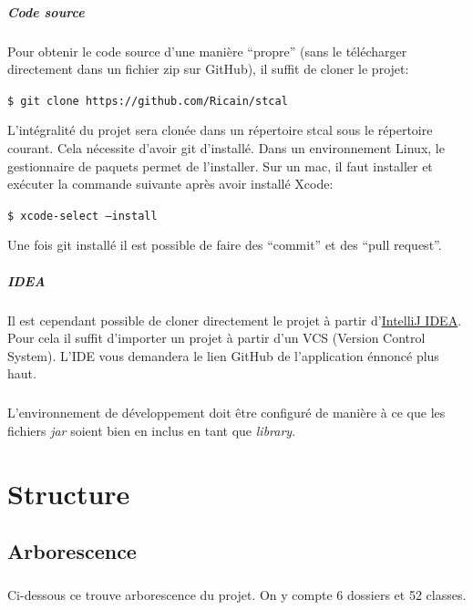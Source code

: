 \documentclass[a4paper,10pt]{report}
\newcommand{\code}[1]{\texttt{#1}}
\begin{document}
			\paragraph[Code source]{Code source}
			  Pour obtenir le code source d'une manière ``propre'' (sans le télécharger directement dans un fichier zip sur GitHub), il suffit de cloner le projet:

			  \code{\$ git clone https://github.com/Ricain/stcal}

			  L'intégralité du projet sera clonée dans un répertoire stcal sous le répertoire courant. Cela nécessite d'avoir git d'installé. Dans un environnement Linux, le gestionnaire de paquets permet de l'installer. 
			  Sur un mac, il faut installer et exécuter la commande suivante après avoir installé Xcode:

			  \code{\$ xcode-select --install}

			  Une fois git installé il est possible de faire des ``commit'' et des ``pull request''.

			\paragraph[IDEA]{IDEA}
			Il est cependant possible de cloner directement le projet à partir d'\href{http://www.jetbrains.com/idea/}{IntelliJ IDEA}. Pour cela il suffit d'importer un projet à partir d'un VCS (Version Control System). L'IDE vous demandera le lien GitHub de l'application énnoncé plus haut.

			\paragraph*{}
			L’environnement de développement doit être configuré de manière à ce que les fichiers \textit{jar} soient bien en inclus en tant que \textit{library}.

\chapter{Structure}

	\section{Arborescence}

	\paragraph*{}
	Ci-dessous ce trouve arborescence du projet. On y compte 6 dossiers et 52 classes.
\end{document}
